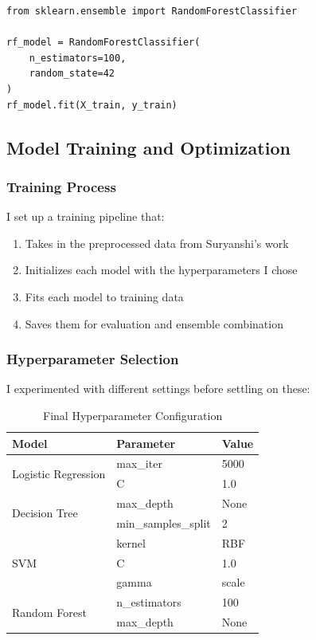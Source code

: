 \documentclass[12pt]{article}
\begin{document}
\begin{lstlisting}[style=pythonstyle, caption={Random Forest Implementation}]
from sklearn.ensemble import RandomForestClassifier

rf_model = RandomForestClassifier(
    n_estimators=100,
    random_state=42
)
rf_model.fit(X_train, y_train)
\end{lstlisting}

\subsection{Model Training and Optimization}

\subsubsection{Training Process}
I set up a training pipeline that:
\begin{enumerate}
    \item Takes in the preprocessed data from Suryanshi's work
    \item Initializes each model with the hyperparameters I chose
    \item Fits each model to training data
    \item Saves them for evaluation and ensemble combination
\end{enumerate}

\subsubsection{Hyperparameter Selection}
I experimented with different settings before settling on these:

\begin{table}[H]
\centering
\caption{Final Hyperparameter Configuration}
\begin{tabular}{lll} %
\toprule
\textbf{Model} & \textbf{Parameter} & \textbf{Value} \\ 
\midrule
\multirow{2}{*}{Logistic Regression} & max\_iter & 5000 \\ 
                                     & C & 1.0 \\ 
\hline
\multirow{2}{*}{Decision Tree}       & max\_depth & None \\ 
                                     & min\_samples\_split & 2 \\ 
\hline
\multirow{3}{*}{SVM}                 & kernel & RBF \\ 
                                     & C & 1.0 \\ 
                                     & gamma & scale \\ 
\hline
\multirow{2}{*}{Random Forest}       & n\_estimators & 100 \\ 
                                     & max\_depth & None \\ 
\bottomrule
\end{tabular}
\end{table}
\end{document}
